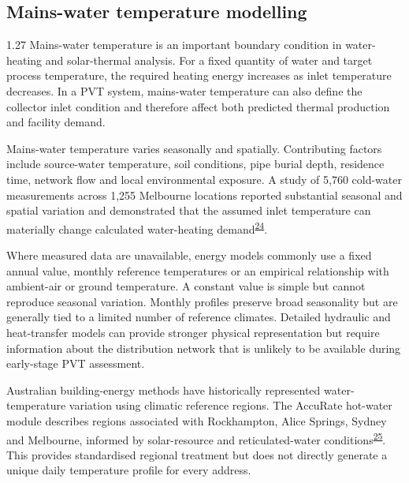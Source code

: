 \documentclass[12pt,letterpaper]{article}
\newcommand{\done}{\ \textcolor{green!45!black}{$\checkmark$}} %
\DeclareRobustCommand{\citenum}[1]{\hyperlink{ref:#1}{#1}} %
\begin{document}
\subsection[Mains-water temperature modelling\done]{Mains-water temperature modelling}\label{sec12}

\begin{spacing}{1.27}
Mains-water temperature is an important boundary condition in water-heating and solar-thermal analysis. For a fixed quantity of water and target process temperature, the required heating energy increases as inlet temperature decreases. In a PVT system, mains-water temperature can also define the collector inlet condition and therefore affect both predicted thermal production and facility demand.\par

\vspace{0.15in}

Mains-water temperature varies seasonally and spatially. Contributing factors include source-water temperature, soil conditions, pipe burial depth, residence time, network flow and local environmental exposure. A study of 5,760 cold-water measurements across 1,255 Melbourne locations reported substantial seasonal and spatial variation and demonstrated that the assumed inlet temperature can materially change calculated water-heating demand\textsuperscript{\citenum{24}}.\par

\vspace{0.15in}

Where measured data are unavailable, energy models commonly use a fixed annual value, monthly reference temperatures or an empirical relationship with ambient-air or ground temperature. A constant value is simple but cannot reproduce seasonal variation. Monthly profiles preserve broad seasonality but are generally tied to a limited number of reference climates. Detailed hydraulic and heat-transfer models can provide stronger physical representation but require information about the distribution network that is unlikely to be available during early-stage PVT assessment.\par

\vspace{0.15in}

Australian building-energy methods have historically represented water-temperature variation using climatic reference regions. The AccuRate hot-water module describes regions associated with Rockhampton, Alice Springs, Sydney and Melbourne, informed by solar-resource and reticulated-water conditions\textsuperscript{\citenum{25}}. This provides standardised regional treatment but does not directly generate a unique daily temperature profile for every address.\par


\end{spacing}
\end{document}
